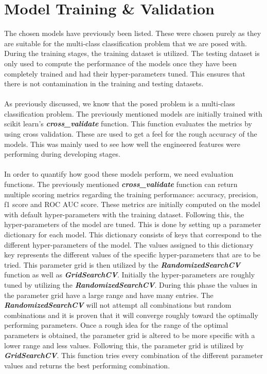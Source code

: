 \documentclass[a4paper,12pt]{article}
\begin{document}
	\section{Model Training \& Validation}
	
	The chosen models have previously been listed. These were chosen purely as they are suitable for the multi-class classification problem that we are posed with. During the training stages, the training dataset is utilized. The testing dataset is only used to compute the performance of the models once they have been completely trained and had their hyper-parameters tuned. This ensures that there is not contamination in the training and testing datasets.\\
	\\
	As previously discussed, we know that the posed problem is a multi-class classification problem. The previously mentioned models are initially trained with scikit learn’s \textbf{\textit{cross\_validate}} function. This function evaluates the metrics by using cross validation. These are used to get a feel for the rough accuracy of the models. This was mainly used to see how well the engineered features were performing during developing stages. \\
	\\
	In order to quantify how good these models perform, we need evaluation functions. The previously mentioned \textbf{\textit{cross\_validate}} function can return multiple scoring metrics regarding the training performance: accuracy, precision, f1 score and ROC AUC score. These metrics are initially computed on the model with default hyper-parameters with the training dataset. Following this, the hyper-parameters of the model are tuned. This is done by setting up a parameter dictionary for each model. This dictionary consists of keys that correspond to the different hyper-parameters of the model. The values assigned to this dictionary key represents the different values of the specific hyper-parameters that are to be tried. This parameter grid is then utilized by the \textbf{\textit{RandomizedSearchCV}} function as well as \textbf{\textit{GridSearchCV}}. Initially the hyper-parameters are roughly tuned by utilizing the \textbf{\textit{RandomizedSearchCV}}. During this phase the values in the parameter grid have a large range and have many entries. The \textbf{\textit{RandomizedSearchCV}} will not attempt all combinations but random combinations and it is proven that it will converge roughly toward the optimally performing parameters. Once a rough idea for the range of the optimal parameters is obtained, the parameter grid is altered to be more specific with a lower range and less values. Following this, the parameter grid is utilized by \textbf{\textit{GridSearchCV}}. This function tries every combination of the different parameter values and returns the best performing combination. \\
\end{document}
